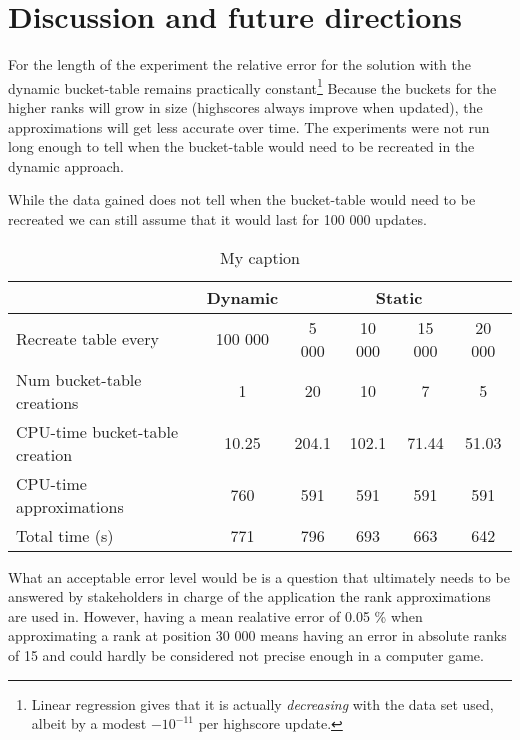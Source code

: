 \chapter{\label{discussion}Discussion and future directions}

For the length of the experiment the relative error for the solution with the dynamic bucket-table remains practically constant\footnote{Linear regression gives that it is actually \emph{decreasing} with the data set used, albeit by a modest $-10^{-11}$ per highscore update.} Because the buckets for the higher ranks will grow in size (highscores always improve when updated), the approximations will get less accurate over time. The experiments were not run long enough to tell when the bucket-table would need to be recreated in the dynamic approach.

While the data gained does not tell when the bucket-table would need to be recreated we can still assume that it would last for 100 000 updates.


\begin{table}[]
\centering
\caption{My caption}
\label{my-label}
\vspace{4mm}
\begin{tabular}{l|c|cccc}

           & Dynamic                    & \multicolumn{4}{c}{Static}                                                       \\ \hline 
Recreate table every           & 100 000 & 5 000 & 10 000 & 15 000 & 20 000 \\
Num bucket-table creations     & 1                          & 20                       & 10                        & 7                         & 5                         \\ \hline
CPU-time bucket-table creation & 10.25                     & 204.1                    & 102.1                    & 71.44                    & 51.03                    \\
CPU-time approximations        & 760                    & 591 & 591 &591&591                      \\ \hline
Total time (s)                 & 771                    & 796                    & 693                    & 663                   & 642                  
\end{tabular}
\vspace{4mm}
\end{table}

What an acceptable error level would be is a question that ultimately needs to be answered by stakeholders in charge of the application the rank approximations are used in. However, having a mean realative error of 0.05 \% when approximating a rank at position 30 000 means having an error in absolute ranks of 15 and could hardly be considered not precise enough in a computer game.


